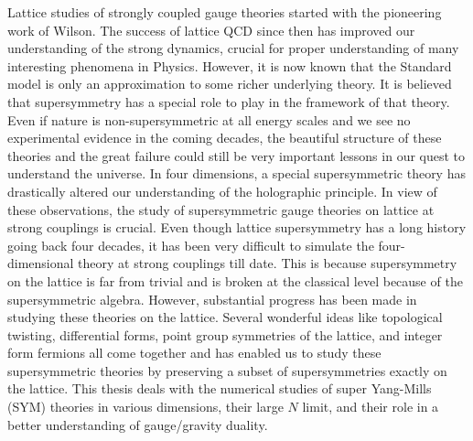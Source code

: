 Lattice studies of strongly coupled gauge theories started with the pioneering work of 
Wilson. The success of lattice QCD since then has improved our understanding of the 
strong dynamics, crucial for proper understanding of many interesting phenomena in Physics. 
However, it is now known that the Standard model is only an approximation to some richer 
underlying theory. It is believed that supersymmetry has a special role to play in the framework of that theory. 
Even if nature is non-supersymmetric at all energy scales and we see no experimental evidence 
in the coming decades, the beautiful structure of these theories
and the great failure could still be very important lessons in our quest to understand the universe. 
In four dimensions, a special supersymmetric theory has drastically altered our understanding 
of the holographic principle. In view of these observations, the study of supersymmetric
gauge theories on lattice at strong couplings is crucial. Even though lattice supersymmetry has a long history 
going back four decades, it has been very difficult to simulate the four-dimensional theory at strong
couplings till date. This is because supersymmetry on the lattice is far from trivial and is broken 
at the classical level because of the supersymmetric algebra. However, substantial progress has 
been made in studying these theories on the lattice. Several wonderful ideas like topological twisting, 
differential forms, point group symmetries of the lattice, and integer form fermions all come together 
and has enabled us to study these supersymmetric theories by preserving a subset of 
supersymmetries exactly on the lattice. This thesis deals with the numerical studies of super Yang-Mills 
(SYM) theories in various dimensions, their large $N$ limit, and their role in a better understanding 
of gauge/gravity duality. 